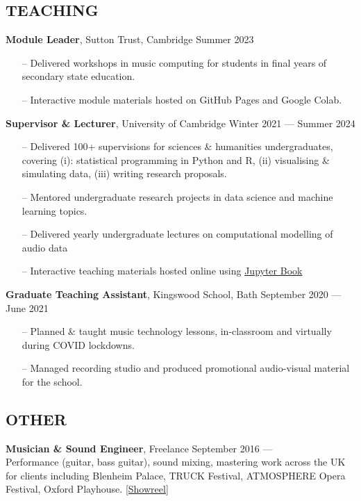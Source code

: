 \documentclass[11pt]{res_academic} %
\begin{document}
\begin{resume}
\subsection{TEACHING}\vspace{-8pt}
\textbf{Module Leader}, Sutton Trust, Cambridge \hfill Summer 2023
\begin{itemize}[leftmargin=*]
	\setlength\itemsep{0pt}
		\item[--]Delivered workshops in music computing for students in final years of secondary state education. 
		\item[--]Interactive module materials hosted on GitHub Pages and Google Colab.
\end{itemize}
\textbf{Supervisor \& Lecturer}, University of Cambridge \hfill Winter 2021 --- Summer 2024
\begin{itemize}[leftmargin=*]
	\setlength\itemsep{0pt}
		\item[--]Delivered 100+ supervisions for sciences \& humanities undergraduates, covering (i): statistical programming in Python and \textsf{R}, (ii) visualising \& simulating data, (iii) writing research proposals.
		\item[--]Mentored undergraduate research projects in data science and machine learning topics.
		\item[--]Delivered yearly undergraduate lectures on computational modelling of audio data
		\item[--]Interactive teaching materials hosted online using \href{https://huwcheston.github.io/PS-Supervision/intro.html}{Jupyter Book}
\end{itemize}
\textbf{Graduate Teaching Assistant}, Kingswood School, Bath \hfill September 2020 --- June 2021
\begin{itemize}[leftmargin=*]
	\setlength\itemsep{0pt}
		\item[--]Planned \& taught music technology lessons, in-classroom and virtually during COVID lockdowns.
		\item[--]Managed recording studio and produced promotional audio-visual material for the school.
\end{itemize}\vspace{-16pt}
\subsection{OTHER}\vspace{-8pt}
\textbf{Musician \& Sound Engineer}, Freelance \hfill September 2016 --- \\
Performance (guitar, bass guitar), sound mixing, mastering work across the UK for clients including Blenheim Palace, TRUCK Festival, ATMOSPHERE Opera Festival, Oxford Playhouse. \href{https://www.youtube.com/watch?v=2ccWNviTf4A&ab_channel=HuwCheston}{[Showreel]} \hfill 


\end{resume}
\end{document}

